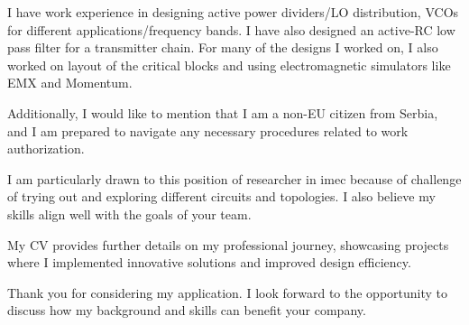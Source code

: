 \documentclass[11pt, a4paper]{awesome-cv} %
\begin{document}
\makecvheader %

\makelettertitle %


\begin{cvletter}



I have work experience in designing active power dividers/LO distribution, VCOs for different applications/frequency bands. I have also designed an active-RC low pass filter for a transmitter chain. For many of the designs I worked on, I also worked on layout of the critical blocks and using electromagnetic simulators like EMX and Momentum.


Additionally, I would like to mention that I am a non-EU citizen from Serbia, and I am prepared to navigate any necessary procedures related to work authorization.



I am particularly drawn to this position of researcher in imec because of challenge of trying out and exploring different circuits and topologies. I also believe my skills align well with the goals of your team.



My CV provides further details on my professional journey, showcasing projects where I implemented innovative solutions and improved design efficiency. 

Thank you for considering my application. I look forward to the opportunity to discuss how my background and skills can benefit your company.

\end{cvletter}


\makeletterclosing %
\end{document}
